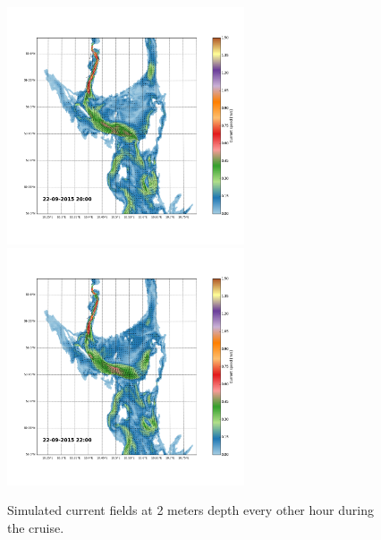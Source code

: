 \documentclass[12pt,a4paper,english]{article}
\begin{document}
\begin{figure}[ht]
{}
\centerline{
\includegraphics*[trim=2.0cm 3cm 6.0cm 3.5cm,clip=true,height=7cm]{Python/stromfelt_102}
\includegraphics*[trim=3.7cm 3cm 1.3cm 3.5cm,clip=true,height=7cm]{Python/stromfelt_104}
}
\caption{\small
Simulated current fields at 2 meters depth every other hour during the cruise.}
\label{fig:Current3}
\end{figure}
\end{document}
